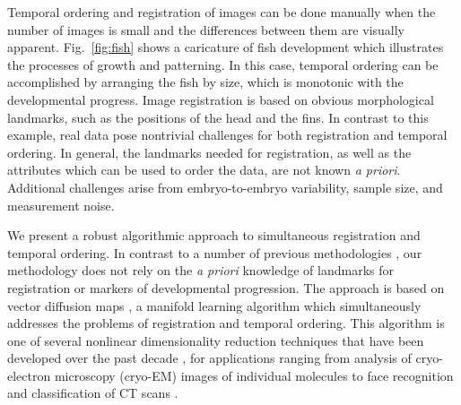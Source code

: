 \documentclass[twocolumn, 10pt]{article}
\newcommand{\fig}[0]{Fig.}
\begin{document}
Temporal ordering and registration of images can be done manually
when the number of images is small and the differences between them are visually apparent.
%
\fig~\ref{fig:fish} shows a caricature of fish development which illustrates the processes of growth and patterning.
%
In this case, temporal ordering can be accomplished by arranging the fish by size, which is monotonic with the developmental progress.
%
Image registration is based on obvious morphological landmarks, such as the positions of the head and the fins.
%
In contrast to this example, real data pose nontrivial challenges for both registration and temporal ordering.
%
In general, the landmarks needed for registration, as well as the attributes which can be used to order the data, are not known {\it a priori}.
%
Additional challenges arise from embryo-to-embryo variability, sample size, and measurement noise.


We present a robust algorithmic approach to simultaneous registration and temporal ordering.
%
In contrast to a number of previous methodologies \citep{zitova2003image, rowley1998rotation, hajnal2010medical, greenspan1994rotation, zhao2003face, dubuis2013accurate}, our methodology does not rely on the {\em a priori} knowledge of landmarks for registration or markers of developmental progression.
%
The approach is based on vector diffusion maps \citep{singer2012vector}, a manifold learning algorithm which simultaneously addresses the problems of registration and temporal ordering.
%
This algorithm is one of several nonlinear dimensionality reduction techniques that have been developed over the past decade \citep{Belkin2003, coifman2005geometric, coifman2006geometric, tenenbaum2000global, roweis2000nonlinear}, for
applications ranging from analysis of cryo-electron microscopy (cryo-EM) images of individual molecules  \citep{zhao2014rotationally, singer2011viewing} to face recognition \citep{lafon2006data} and classification of CT scans \citep{fernandez2014diffusion}.
\end{document}
